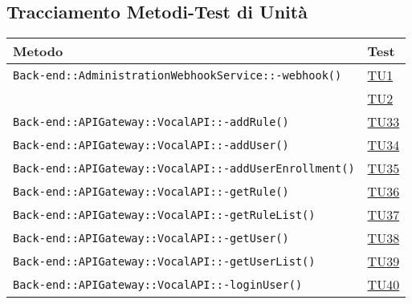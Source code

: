 \subsection{Tracciamento Metodi-Test di Unità}
\normalsize
\begin{longtable}{|>{\centering}m{12cm}|m{1cm}<{\centering}|}
\hline 
\textbf{Metodo} & \textbf{Test}\\
\hline
\endhead\texttt{Back-end::AdministrationWebhookService::-\linebreak webhook()} & \hyperlink{TU1}{TU1}\\ & \hyperlink{TU2}{TU2}\\ \hline
\texttt{Back-end::APIGateway::VocalAPI::-\linebreak addRule()} & \hyperlink{TU33}{TU33}\\ \hline
\texttt{Back-end::APIGateway::VocalAPI::-\linebreak addUser()} & \hyperlink{TU34}{TU34}\\ \hline
\texttt{Back-end::APIGateway::VocalAPI::-\linebreak addUserEnrollment()} & \hyperlink{TU35}{TU35}\\ \hline
\texttt{Back-end::APIGateway::VocalAPI::-\linebreak getRule()} & \hyperlink{TU36}{TU36}\\ \hline
\texttt{Back-end::APIGateway::VocalAPI::-\linebreak getRuleList()} & \hyperlink{TU37}{TU37}\\ \hline
\texttt{Back-end::APIGateway::VocalAPI::-\linebreak getUser()} & \hyperlink{TU38}{TU38}\\ \hline
\texttt{Back-end::APIGateway::VocalAPI::-\linebreak getUserList()} & \hyperlink{TU39}{TU39}\\ \hline
\texttt{Back-end::APIGateway::VocalAPI::-\linebreak loginUser()} & \hyperlink{TU40}{TU40}\\ \hline

\end{longtable}
